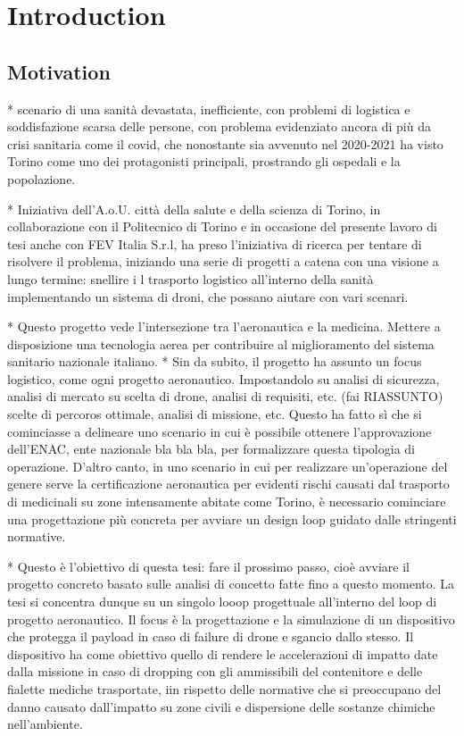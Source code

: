 \chapter{Introduction}
\label{chapter:introduction}


\section{Motivation}


* scenario di una sanità devastata, inefficiente, con problemi di logistica e soddisfazione scarsa delle persone, con problema evidenziato ancora di più da crisi sanitaria come il covid, che nonostante sia avvenuto nel 2020-2021 ha visto Torino come uno dei protagonisti principali, prostrando gli ospedali e la popolazione. 

* Iniziativa dell'A.o.U. città della salute e della scienza di Torino, in collaborazione con il Politecnico di Torino e in occasione del presente lavoro di tesi anche con FEV Italia S.r.l, ha preso l'iniziativa di ricerca per tentare di risolvere il problema, iniziando una serie di progetti a catena con una visione a lungo termine: snellire i l trasporto logistico all'interno della sanità implementando un sistema di droni, che possano aiutare con vari scenari. 

* Questo progetto vede l'intersezione tra l'aeronautica e la medicina. Mettere a disposizione una tecnologia aerea per contribuire al miglioramento del sistema sanitario nazionale italiano. 
* Sin da subito, il progetto ha assunto un focus logistico, come ogni progetto aeronautico. Impostandolo su analisi di sicurezza, analisi di mercato su scelta di drone, analisi di requisiti, etc. (fai RIASSUNTO) scelte di percoros ottimale, analisi di missione, etc. Questo ha fatto sì che si cominciasse a delineare uno scenario in cui è possibile ottenere l'approvazione dell'ENAC, ente nazionale bla bla bla, per formalizzare questa tipologia di operazione. D'altro canto, in uno scenario in cui per realizzare un'operazione del genere serve la certificazione aeronautica per evidenti rischi causati dal trasporto di medicinali su zone intensamente abitate come Torino, è necessario cominciare una progettazione più concreta per avviare un design loop guidato dalle stringenti normative. 

* Questo è l'obiettivo di questa tesi: fare il prossimo passo, cioè avviare il progetto concreto basato sulle analisi di concetto fatte fino a questo momento. La tesi si concentra dunque su un singolo looop progettuale all'interno del loop di progetto aeronautico. Il focus è la progettazione e la simulazione di un dispositivo che protegga il payload in caso di failure di drone e sgancio dallo stesso. Il dispositivo ha come obiettivo quello di rendere le accelerazioni di impatto date dalla missione in caso di dropping con gli ammissibili del contenitore e delle fialette mediche trasportate, iin rispetto delle normative che si preoccupano del danno causato dall'impatto su zone civili e dispersione delle sostanze chimiche nell'ambiente. 

